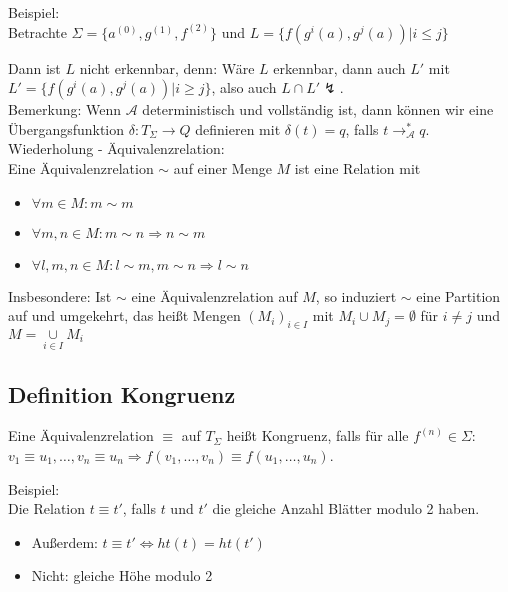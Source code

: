 \documentclass[titlepage]{article}
\begin{document}
Beispiel:\\

Betrachte $\Sigma = \{ a^{(0)}, g^{(1)}, f^{(2)}\}$ und 
$L = \{ f(g^i(a),g^j(a)) | i \leq j \}$

Dann ist $L$ nicht erkennbar, denn: W\"are $L$ erkennbar, dann auch $L'$ mit 
$L' = \{ f(g^i(a), g^j(a)) | i \geq j \}$, 
also auch $L \cap L' \lightning$. \\

Bemerkung: Wenn $\mathcal{A}$ deterministisch und vollst\"andig ist, 
dann k\"onnen wir eine \"Ubergangsfunktion 
$\delta: T_\Sigma \rightarrow Q$ definieren mit $\delta (t) = q$, falls 
$t \rightarrow_\mathcal{A}^\ast q$.\\

Wiederholung - \"Aquivalenzrelation:\\

Eine \"Aquivalenzrelation $\sim $ auf einer Menge $M$ ist eine Relation mit

\begin{itemize}
	\item $\forall m \in M: m\sim m$
	\item $\forall m, n \in M: m\sim n \Rightarrow n\sim m$
	\item $\forall l, m, n \in M: l\sim m, m\sim n \Rightarrow l\sim n$
\end{itemize}

Insbesondere: Ist $\sim $ eine \"Aquivalenzrelation auf $M$, so induziert $\sim $ eine 
Partition auf und umgekehrt, das hei\ss t Mengen 
$(M_i)_{i \in I}$ mit $M_i \cup M_j = \emptyset$ f\"ur $i \neq j$ und 
$M = \underset{i \in I}{\cup} M_i$

\subsection{Definition Kongruenz}

Eine \"Aquivalenzrelation $\equiv$ auf $T_\Sigma$ hei\ss t Kongruenz, 
falls f\"ur alle $f^{(n)} \in \Sigma$: \\

$v_1 \equiv u_1, \dots, v_n \equiv u_n \Rightarrow f(v_1, \dots, v_n) \equiv 
f(u_1, \dots, u_n)$.

Beispiel:\\
Die Relation $t \equiv t'$, falls $t$ und $t'$ die gleiche Anzahl Bl\"atter modulo 2 haben.

\begin{itemize}
	\item Au\ss erdem: $t \equiv t' \Leftrightarrow ht(t) = ht(t')$
	\item Nicht: gleiche H\"ohe modulo 2
\end{itemize}
\end{document}
